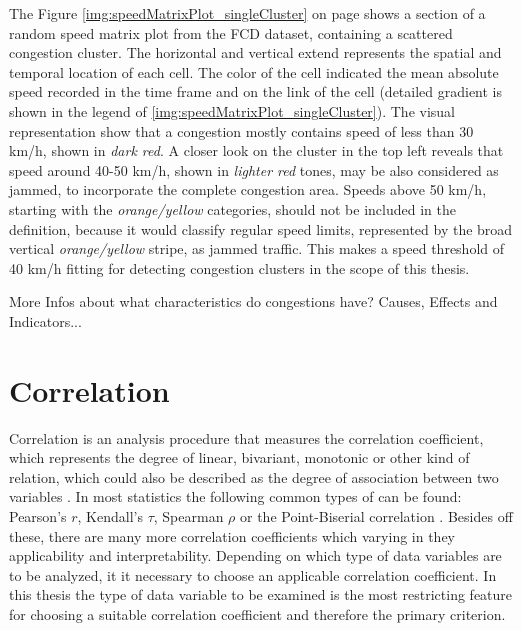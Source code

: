 \documentclass[a4paper,12pt]{report}
\begin{document}
The Figure \ref{img:speedMatrixPlot_singleCluster} on page \pageref{img:speedMatrixPlot_singleCluster} shows a section of a random speed matrix plot from the FCD dataset, containing a scattered congestion cluster. The horizontal and vertical extend represents the spatial and temporal location of each cell. The color of the cell indicated the mean absolute speed recorded in the time frame and on the link of the cell (detailed gradient is shown in the legend of \ref{img:speedMatrixPlot_singleCluster}). The visual representation show that a congestion mostly contains speed of less than 30 km/h, shown in \textit{dark red}. A closer look on the cluster in the top left reveals that speed around 40-50 km/h, shown in \textit{lighter red} tones, may be also considered as jammed, to incorporate the complete congestion area. Speeds above 50 km/h, starting with the \textit{orange/yellow} categories, should not be included in the definition, because it would classify regular speed limits, represented by the broad vertical \textit{orange/yellow} stripe, as jammed traffic. This makes a speed threshold of 40 km/h fitting for detecting congestion clusters in the scope of this thesis.

More Infos about what characteristics do congestions have? Causes, Effects and Indicators...


\chapter{Correlation}
\label{definition_correlation}
Correlation is an analysis procedure that measures the correlation coefficient, which represents the degree of linear, bivariant, monotonic or other kind of relation, which could also be described as the degree of association between two variables \cite{HerzSchlicherSiegener1992}. In most statistics the following common types of can be found: Pearson's $r$, Kendall's $\tau$, Spearman  $\rho$ or the Point-Biserial correlation \cite{Ramzai2020,SPSS2020a,SPSS2020b}. Besides off these, there are many more correlation coefficients which varying in they applicability and interpretability. Depending on which type of data variables are to be analyzed, it it necessary to choose an applicable correlation coefficient. In this thesis the type of data variable to be examined is the most restricting feature for choosing a suitable correlation coefficient and therefore the primary criterion. 
\end{document}
